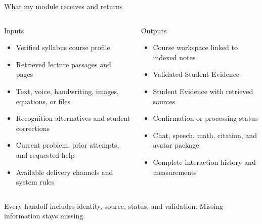 \documentclass[aspectratio=169,10pt]{beamer}
\begin{document}
\begin{frame}{What my module receives and returns}
\small
\begin{columns}[T,onlytextwidth]
\begin{block}{Inputs}
\begin{itemize}
\item Verified syllabus course profile
\item Retrieved lecture passages and pages
\item Text, voice, handwriting, images, equations, or files
\item Recognition alternatives and student corrections
\item Current problem, prior attempts, and requested help
\item Available delivery channels and system rules
\end{itemize}
\end{block}
\begin{block}{Outputs}
\begin{itemize}
\item Course workspace linked to indexed notes
\item Validated Student Evidence
\item Student Evidence with retrieved sources
\item Confirmation or processing status
\item Chat, speech, math, citation, and avatar package
\item Complete interaction history and measurements
\end{itemize}
\end{block}
\end{columns}
\vspace{.35em}
\centering
Every handoff includes identity, source, status, and validation. Missing information stays missing.
\end{frame}
\end{document}
